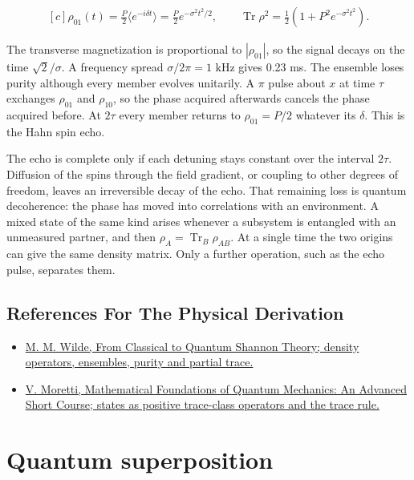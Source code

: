 \documentclass[11pt,oneside]{book}
\newenvironment{centeredalign}{\[\begin{gathered}[c]}{\end{gathered}\]}
\begin{document}
\begin{centeredalign}
\rho_{01}(t)=\tfrac P2\langle e^{-i\delta t}\rangle=\tfrac P2e^{-\sigma^2t^2/2},\qquad
\operatorname{Tr}\rho^2=\tfrac12\left(1+P^2e^{-\sigma^2t^2}\right).
\end{centeredalign}

The transverse magnetization is proportional to \(|\rho_{01}|\), so the signal decays on the time \(\sqrt2/\sigma\). A frequency spread \(\sigma/2\pi=1\) kHz gives 0.23 ms. The ensemble loses purity although every member evolves unitarily. A \(\pi\) pulse about \(x\) at time \(\tau\) exchanges \(\rho_{01}\) and \(\rho_{10}\), so the phase acquired afterwards cancels the phase acquired before. At \(2\tau\) every member returns to \(\rho_{01}=P/2\) whatever its \(\delta\). This is the Hahn spin echo.

The echo is complete only if each detuning stays constant over the interval \(2\tau\). Diffusion of the spins through the field gradient, or coupling to other degrees of freedom, leaves an irreversible decay of the echo. That remaining loss is quantum decoherence: the phase has moved into correlations with an environment. A mixed state of the same kind arises whenever a subsystem is entangled with an unmeasured partner, and then \(\rho_A=\operatorname{Tr}_B\rho_{AB}\). At a single time the two origins can give the same density matrix. Only a further operation, such as the echo pulse, separates them.

\subsection*{References For The Physical Derivation}
\begin{itemize}
\item \href{https://arxiv.org/abs/1106.1445}{M. M. Wilde, From Classical to Quantum Shannon Theory; density operators, ensembles, purity and partial trace.}
\item \href{https://arxiv.org/abs/1508.06951}{V. Moretti, Mathematical Foundations of Quantum Mechanics: An Advanced Short Course; states as positive trace-class operators and the trace rule.}
\end{itemize}





\clearpage

\section{Quantum superposition}
\end{document}
